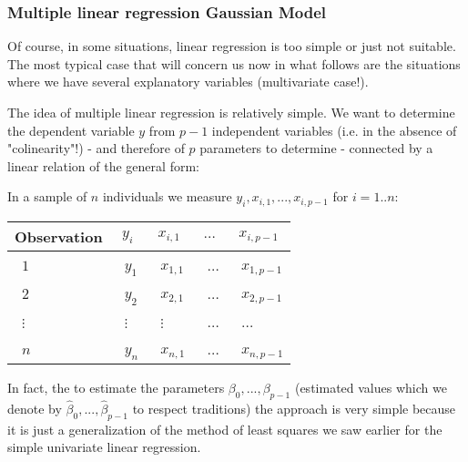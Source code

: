 	\subsubsection{Multiple linear regression Gaussian Model}\label{multiple linear regression gaussian model}
	Of course, in some situations, linear regression is too simple or just not suitable. The most typical case that will concern us now in what follows are the situations where we have several explanatory variables (multivariate case!).
	
	The idea of multiple linear regression is relatively simple. We want to determine the dependent variable $y$ from $p-1$ independent variables (i.e. in the absence of "colinearity"!) - and therefore of $p$ parameters to determine - connected by a linear relation of the general form:
	
	In a sample of $n$ individuals we measure $y_i,x_{i,1},...,x_{i,p-1}$ for $i=1..n$:
	\begin{table}[H]
	\begin{center}
			\begin{tabular}{|p{2cm}|p{2cm}|p{2cm}|p{2cm}|p{2cm}|}
				\hline
				\multicolumn{1}{c}{\cellcolor{black!30}\textbf{Observation}} & 
  \multicolumn{1}{c}{\cellcolor{black!30}\textbf{$y_i$}}  & \multicolumn{1}{c}{\cellcolor{black!30}\textbf{$x_{i,1}$}} & \multicolumn{1}{c}{\cellcolor{black!30}\textbf{$\ldots$}} & \multicolumn{1}{c}{\cellcolor{black!30}\textbf{$x_{i,p-1}$}} \\ \hline
				\centering\arraybackslash\ $1$ & \centering\arraybackslash\ $y_1$ & \centering\arraybackslash\ $x_{1,1}$ & \centering\arraybackslash\ $\ldots$ & \centering\arraybackslash\ $x_{1,p-1}$ \\ \hline
				\centering\arraybackslash\ $2$ & \centering\arraybackslash\ $y_2$ & \centering\arraybackslash\ $x_{2,1}$ & \centering\arraybackslash\ $\ldots$ & \centering\arraybackslash\ $x_{2,p-1}$ \\ \hline
				\centering\arraybackslash\ $\vdots$ & \centering\arraybackslash\ $\vdots$ & \centering\arraybackslash\ $\vdots$ & \centering\arraybackslash\ $\ldots$  & \centering\arraybackslash\ $\ldots$\\ \hline
				\centering\arraybackslash\ $n$ & \centering\arraybackslash\ $y_n$ & \centering\arraybackslash\ $x_{n,1}$ & \centering\arraybackslash\ $\ldots$ & \centering\arraybackslash\ $x_{n,p-1}$ \\ \hline
		\end{tabular}
	\end{center}
	\end{table}
	In fact, the to estimate the parameters $\beta_0,...,\beta_{p-1}$ (estimated values which we denote by $\hat{\beta}_0,...,\hat{\beta}_{p-1}$ to respect traditions) the approach is very simple because it is just a generalization of the method of least squares we saw earlier for the simple univariate linear regression.
	
